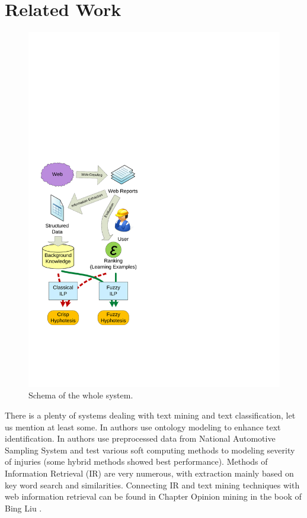 \documentclass[authoryear,12pt]{elsarticle}
\begin{document}
\section{Related Work} \label{dedek:related}

\begin{figure}
\vspace{-1.5cm}
\centerline{\includegraphics[width=\hsize]{img/schema}}
\caption{Schema of the whole system.}
\label{img:schema}
\end{figure}

There is a plenty of systems dealing with text mining and text classification, let us mention at least some. In \citep{dedek:ReYaLiOntoText08} authors use ontology modeling to enhance text identification. In \citep{dedek:CAP} authors use preprocessed data from National Automotive Sampling System and test various soft computing methods to modeling severity of injuries (some hybrid methods showed best performance). Methods of Information Retrieval (IR) are very numerous, with extraction mainly based on key word search and similarities. Connecting IR and text mining techniques with web information retrieval can be found in Chapter Opinion mining in the book of Bing Liu \citep{dedek:WebDataMining}. 
\end{document}
